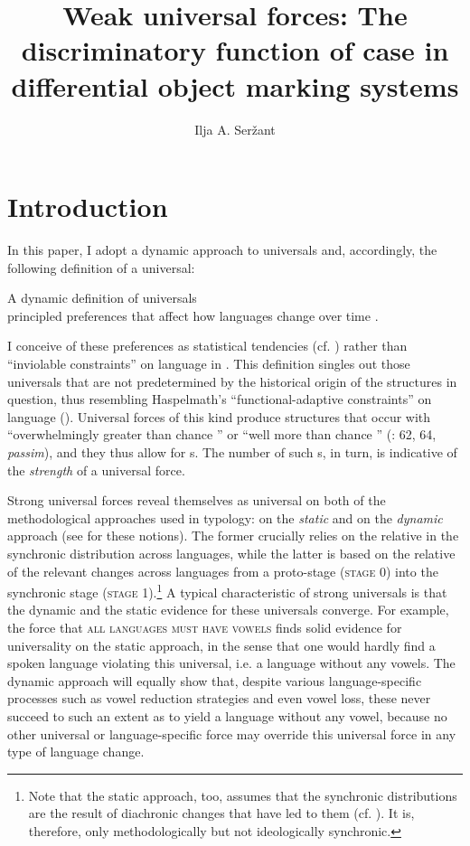 \documentclass[output=paper]{langsci/langscibook}
\author{Ilja A. Seržant\affiliation{Leipzig University}}
\title{Weak universal forces: The discriminatory function of case in differential object marking systems}
\begin{document}
\maketitle 
 

\section{Introduction}

In this paper, I adopt a dynamic approach to universals \citep{Greenberg1978_Diachr} and, accordingly, the following definition of a universal:

\ea\label{ex:serzant:1}
A dynamic definition of universals\\
principled preferences that affect how languages change over time \citep[401]{Bickel2011_Modelling}.
\z

\noindent I conceive of these preferences as statistical tendencies (cf. \citealt{Bickel2011_Modelling}) rather than “inviolable constraints” on language in \citet{Kiparsky2008}. This definition singles out those universals that are not predetermined by the historical origin of the structures in question, thus resembling Haspelmath’s “functional-adaptive constraints” on language (). Universal forces of this kind produce structures that occur with “overwhelmingly greater than chance ” or “well more than chance ” (\citealt{Greenberg1963}: 62, 64, \textit{passim}), and they thus allow for s. The number of such s, in turn, is indicative of the \textit{strength} of a universal force. 

Strong universal forces reveal themselves as universal on both of the methodological approaches used in typology: on the \textit{static} and on the \textit{dynamic} approach (see \citealt{Greenberg1969} for these notions). The former crucially relies on the relative  in the synchronic distribution across languages, while the latter is based on the relative  of the relevant changes across languages from a proto-stage (\textsc{stage} 0) into the synchronic stage (\textsc{stage} 1).\footnote{Note that the static approach, too, assumes that the synchronic distributions are the result of diachronic changes that have led to them (cf. ). It is, therefore, only methodologically but not ideologically synchronic.} A typical characteristic of strong universals is that the dynamic and the static evidence for these universals converge. For example, the force that \textsc{all languages must have vowels} \citep[19]{Comrie1989} finds solid evidence for universality on the static approach, in the sense that one would hardly find a spoken language violating this universal, i.e. a language without any vowels. The dynamic approach will equally show that, despite various language-specific processes such as vowel reduction strategies and even vowel loss, these never succeed to such an extent as to yield a language without any vowel, because no other universal or language-specific force may override this universal force in any type of language change.  
\end{document}
